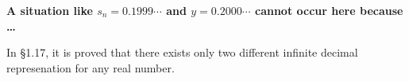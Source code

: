 \documentclass[a4paper,12pt,openany]{book}
\begin{document}
\textbf{\phantom{}}
\textbf{A situation like $s_n = 0.1999\cdots$ and $y = 0.2000\cdots$ cannot occur here because \dots}
\begin{story}
	In \S1.17, it is proved that there exists only two different infinite decimal represenation for any real number.
\end{story}

%


\end{document}
